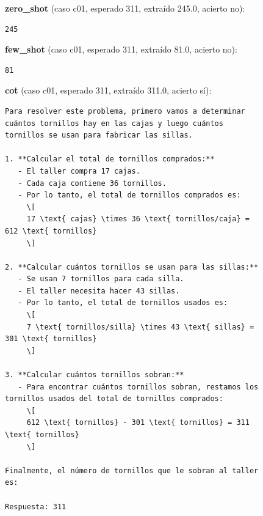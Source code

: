 \documentclass[runningheads]{llncs}
\begin{document}
\smallskip\noindent\textbf{zero\_shot} (caso c01, esperado 311, extraído 245.0, acierto no):
\begin{verbatim}
245
\end{verbatim}


\smallskip\noindent\textbf{few\_shot} (caso c01, esperado 311, extraído 81.0, acierto no):
\begin{verbatim}
81
\end{verbatim}


\smallskip\noindent\textbf{cot} (caso c01, esperado 311, extraído 311.0, acierto sí):
\begin{verbatim}
Para resolver este problema, primero vamos a determinar
cuántos tornillos hay en las cajas y luego cuántos
tornillos se usan para fabricar las sillas.

1. **Calcular el total de tornillos comprados:**
   - El taller compra 17 cajas.
   - Cada caja contiene 36 tornillos.
   - Por lo tanto, el total de tornillos comprados es:
     \[
     17 \text{ cajas} \times 36 \text{ tornillos/caja} =
612 \text{ tornillos}
     \]

2. **Calcular cuántos tornillos se usan para las sillas:**
   - Se usan 7 tornillos para cada silla.
   - El taller necesita hacer 43 sillas.
   - Por lo tanto, el total de tornillos usados es:
     \[
     7 \text{ tornillos/silla} \times 43 \text{ sillas} =
301 \text{ tornillos}
     \]

3. **Calcular cuántos tornillos sobran:**
   - Para encontrar cuántos tornillos sobran, restamos los
tornillos usados del total de tornillos comprados:
     \[
     612 \text{ tornillos} - 301 \text{ tornillos} = 311
\text{ tornillos}
     \]

Finalmente, el número de tornillos que le sobran al taller
es:

Respuesta: 311
\end{verbatim}
\end{document}
